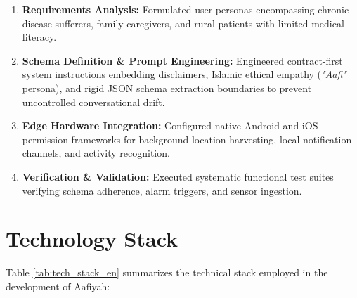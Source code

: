 \documentclass[12pt,a4paper,oneside]{report}
\begin{document}
\begin{enumerate}
    \item \textbf{Requirements Analysis:} Formulated user personas encompassing chronic disease sufferers, family caregivers, and rural patients with limited medical literacy.
    \item \textbf{Schema Definition \& Prompt Engineering:} Engineered contract-first system instructions embedding disclaimers, Islamic ethical empathy (\textit{"Aafi"} persona), and rigid JSON schema extraction boundaries to prevent uncontrolled conversational drift.
    \item \textbf{Edge Hardware Integration:} Configured native Android and iOS permission frameworks for background location harvesting, local notification channels, and activity recognition.
    \item \textbf{Verification \& Validation:} Executed systematic functional test suites verifying schema adherence, alarm triggers, and sensor ingestion.
\end{enumerate}

\chapter{Technology Stack}

Table \ref{tab:tech_stack_en} summarizes the technical stack employed in the development of Aafiyah:
\end{document}
